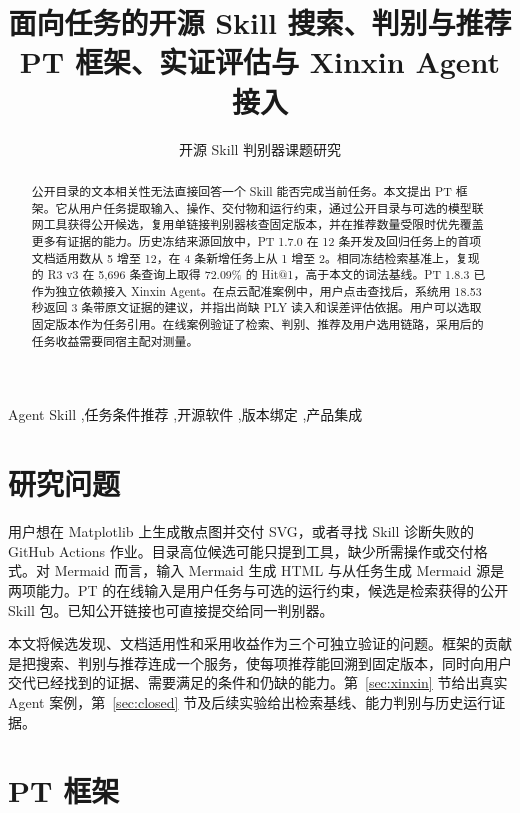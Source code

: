\documentclass[final,5p,twocolumn,10pt]{elsarticle}
\begin{document}
\begin{frontmatter}
\title{面向任务的开源 Skill 搜索、判别与推荐\\PT 框架、实证评估与 Xinxin Agent 接入}
\author{开源 Skill 判别器课题研究}
\address{PT 源码与复核材料 \quad \url{https://github.com/qing1989620/pan-bie-qi}}
\begin{abstract}
公开目录的文本相关性无法直接回答一个 Skill 能否完成当前任务。本文提出 PT 框架。它从用户任务提取输入、操作、交付物和运行约束，通过公开目录与可选的模型联网工具获得公开候选，复用单链接判别器核查固定版本，并在推荐数量受限时优先覆盖更多有证据的能力。历史冻结来源回放中，PT 1.7.0 在 12 条开发及回归任务上的首项文档适用数从 5 增至 12，在 4 条新增任务上从 1 增至 2。相同冻结检索基准上，复现的 R3 v3 在 5,696 条查询上取得 72.09\% 的 Hit@1，高于本文的词法基线。PT 1.8.3 已作为独立依赖接入 Xinxin Agent。在点云配准案例中，用户点击查找后，系统用 18.53 秒返回 3 条带原文证据的建议，并指出尚缺 PLY 读入和误差评估依据。用户可以选取固定版本作为任务引用。在线案例验证了检索、判别、推荐及用户选用链路，采用后的任务收益需要同宿主配对测量。
\end{abstract}
\begin{keyword}
Agent Skill \sep 任务条件推荐 \sep 开源软件 \sep 版本绑定 \sep 产品集成
\end{keyword}
\end{frontmatter}

\section{研究问题}

用户想在 Matplotlib 上生成散点图并交付 SVG，或者寻找 Skill 诊断失败的 GitHub Actions 作业。目录高位候选可能只提到工具，缺少所需操作或交付格式。对 Mermaid 而言，输入 Mermaid 生成 HTML 与从任务生成 Mermaid 源是两项能力。PT 的在线输入是用户任务与可选的运行约束，候选是检索获得的公开 Skill 包。已知公开链接也可直接提交给同一判别器。

本文将候选发现、文档适用性和采用收益作为三个可独立验证的问题。框架的贡献是把搜索、判别与推荐连成一个服务，使每项推荐能回溯到固定版本，同时向用户交代已经找到的证据、需要满足的条件和仍缺的能力。第~\ref{sec:xinxin} 节给出真实 Agent 案例，第~\ref{sec:closed} 节及后续实验给出检索基线、能力判别与历史运行证据。

\section{PT 框架}
\end{document}
